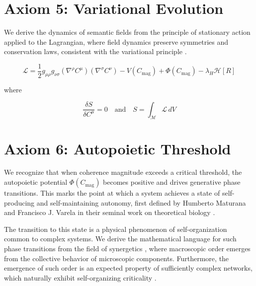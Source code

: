 
\section{Axiom 5: Variational Evolution}
\label{1.5:axiom_5_variational_evolution}

We derive the dynamics of semantic fields from the principle of stationary action applied to the Lagrangian, where field dynamics preserve symmetries and conservation laws, consistent with the variational principle \autocite{GoldsteinPooleSafko2002, Arnold1989}.

\begin{equation}
\mathcal{L} = \frac{1}{2} g_{\mu\rho} g_{\nu\sigma} (\nabla^\rho C^\mu)(\nabla^\sigma C^\nu) - V(C_{\text{mag}}) + \Phi(C_{\text{mag}}) - \lambda_H \mathcal{H}[R]
\end{equation}

where

\begin{equation}
\frac{\delta S}{\delta C^\mu} = 0 \quad \text{and} \quad S = \int_{\mathcal{M}} \mathcal{L} \, dV
\end{equation}


\section{Axiom 6: Autopoietic Threshold}
\label{1.6:axiom_6_autopoietic_threshold}

We recognize that when coherence magnitude exceeds a critical threshold, the autopoietic potential \(\Phi(C_{\text{mag}})\) becomes positive and drives generative phase transitions. This marks the point at which a system achieves a state of self-producing and self-maintaining autonomy, first defined by Humberto Maturana and Francisco J. Varela in their seminal work on theoretical biology \autocite{MaturanaVarela1980}.

The transition to this state is a physical phenomenon of self-organization common to complex systems. We derive the mathematical language for such phase transitions from the field of synergetics \autocite{Haken1983}, where macroscopic order emerges from the collective behavior of microscopic components. Furthermore, the emergence of such order is an expected property of sufficiently complex networks, which naturally exhibit self-organizing criticality \autocite{BakTangWiesenfeld1987}.

